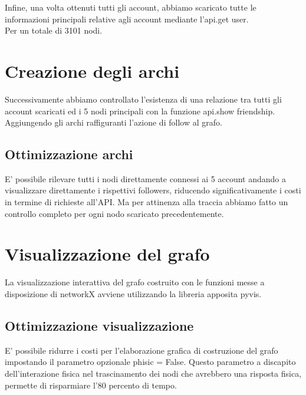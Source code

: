 \documentclass[a4paper,11pt]{report}
\begin{document}
Infine, una volta ottenuti tutti gli account, abbiamo scaricato tutte le informazioni principali relative agli account mediante l'api.get user.\\
Per un totale di 3101 nodi.
\section{Creazione degli archi}
Successivamente abbiamo controllato l'esistenza di una relazione tra tutti gli account scaricati ed i 5 nodi principali con la funzione api.show friendship. Aggiungendo gli archi raffiguranti l'azione di follow al grafo.
\subsection{Ottimizzazione archi}
E' possibile rilevare tutti i nodi direttamente connessi ai 5 account andando a visualizzare direttamente i rispettivi followers, riducendo significativamente i costi in termine di richieste all'API. Ma per attinenza alla traccia abbiamo fatto un controllo completo per ogni nodo scaricato precedentemente.

\section{Visualizzazione del grafo}
La visualizzazione interattiva del grafo costruito con le funzioni messe a disposizione di networkX avviene utilizzando la libreria apposita pyvis.
\subsection{Ottimizzazione visualizzazione}
E' possibile ridurre i costi per l'elaborazione grafica di costruzione del grafo impostando il parametro opzionale phisic = False. Questo parametro a discapito dell'interazione fisica nel trascinamento  dei nodi che avrebbero una risposta fisica, permette di risparmiare l'80 percento di tempo.

\pagebreak
\end{document}
